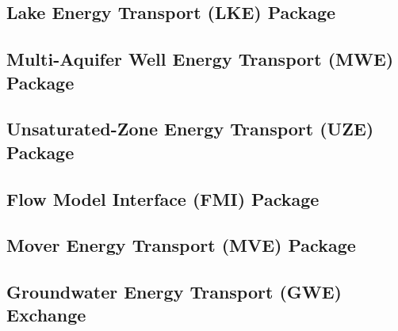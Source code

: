 \newpage
\subsection{Lake Energy Transport (LKE) Package}


\newpage
\subsection{Multi-Aquifer Well Energy Transport (MWE) Package}


\newpage
\subsection{Unsaturated-Zone Energy Transport (UZE) Package}


\newpage
\subsection{Flow Model Interface (FMI) Package}


\newpage
\subsection{Mover Energy Transport (MVE) Package}


\newpage
\subsection{Groundwater Energy Transport (GWE) Exchange}


